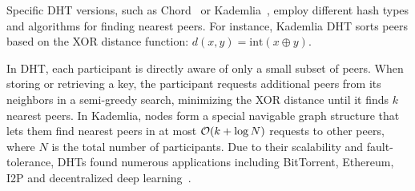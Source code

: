 Specific DHT versions, such as Chord~\cite{chord} or Kademlia~\cite{kademlia}, employ different hash types and algorithms for finding nearest peers. For instance, Kademlia DHT sorts peers based on the XOR distance function: $d(x, y) = \mathrm{int}(x \oplus y)$.

In DHT, each participant is directly aware of only a small subset of peers. When storing or retrieving a key, the participant requests additional peers from its neighbors in a semi-greedy search, minimizing the XOR distance until it finds $k$ nearest peers. In Kademlia, nodes form a special navigable graph structure that lets them find nearest peers in at most ${\cal O}(k + \log N)$ requests to other peers, where $N$ is the total number of participants. Due to their scalability and fault-tolerance, DHTs found numerous applications including BitTorrent, Ethereum, I2P and decentralized deep learning~\cite{learning_at_home}.
